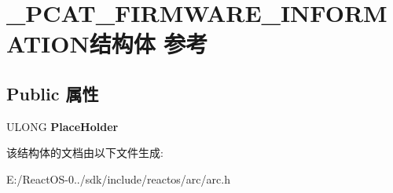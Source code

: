 \hypertarget{struct___p_c_a_t___f_i_r_m_w_a_r_e___i_n_f_o_r_m_a_t_i_o_n}{}\section{\+\_\+\+P\+C\+A\+T\+\_\+\+F\+I\+R\+M\+W\+A\+R\+E\+\_\+\+I\+N\+F\+O\+R\+M\+A\+T\+I\+O\+N结构体 参考}
\label{struct___p_c_a_t___f_i_r_m_w_a_r_e___i_n_f_o_r_m_a_t_i_o_n}
\subsection*{Public 属性}
\begin{DoxyCompactItemize}
\item 
\mbox{\label{struct___p_c_a_t___f_i_r_m_w_a_r_e___i_n_f_o_r_m_a_t_i_o_n_a22b8dfb234b29d22269449f98f240e2c}} 
U\+L\+O\+NG {\bfseries Place\+Holder}
\end{DoxyCompactItemize}


该结构体的文档由以下文件生成\+:\begin{DoxyCompactItemize}
\item 
E\+:/\+React\+O\+S-\/0../sdk/include/reactos/arc/arc.\+h\end{DoxyCompactItemize}
